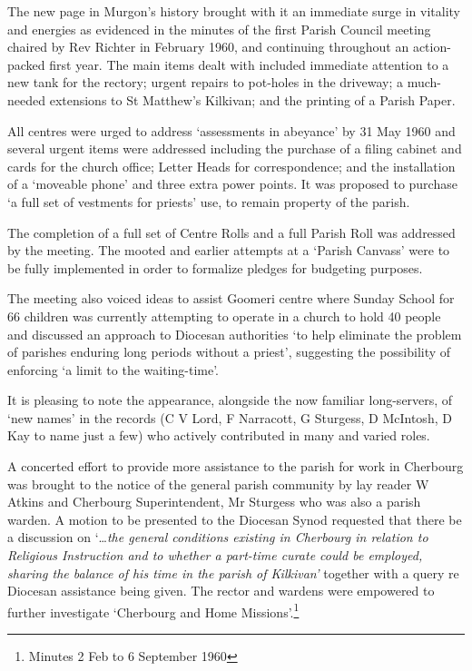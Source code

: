 The new page in Murgon's history brought with it an immediate surge in vitality and energies as evidenced in the minutes of the first Parish Council meeting chaired by Rev Richter in February 1960, and continuing throughout an action-packed first year. The main items dealt with included immediate attention to a new tank for the rectory; urgent repairs to pot-holes in the driveway; a much-needed extensions to St Matthew's Kilkivan; and the printing of a Parish Paper.

All centres were urged to address `assessments in abeyance' by 31 May 1960 and several urgent items were addressed including the purchase of a filing cabinet and cards for the church office; Letter Heads for correspondence; and the installation of a `moveable phone' and three extra power points. It was proposed to purchase `a full set of vestments for priests' use, to remain property of the parish.

The completion of a full set of Centre Rolls and a full Parish Roll was addressed by the meeting. The mooted and earlier attempts at a `Parish Canvass' were to be fully implemented in order to formalize pledges for budgeting purposes.

The meeting also voiced ideas to assist Goomeri centre where Sunday School for 66 children was currently attempting to operate in a church to hold 40 people and discussed an approach to Diocesan authorities `to help eliminate the problem of parishes enduring long periods without a priest', suggesting the possibility of enforcing `a limit to the waiting-time'.

It is pleasing to note the appearance, alongside the now familiar long-servers, of `new names' in the records (C V Lord, F Narracott, G Sturgess, D McIntosh, D Kay to name just a few) who actively contributed in many and varied roles.

A concerted effort to provide more assistance to the parish for work in Cherbourg was brought to the notice of the general parish community by lay reader W Atkins and Cherbourg Superintendent, Mr Sturgess who was also a parish warden. A motion to be presented to the Diocesan Synod requested that there be a discussion on `\ldots{}\emph{the general conditions existing in Cherbourg in relation to Religious Instruction and to whether a part-time curate could be employed, sharing the balance of his time in the parish of Kilkivan'} together with a query re Diocesan assistance being given. The rector and wardens were empowered to further investigate `Cherbourg and Home Missions'.\footnote{Minutes 2 Feb to 6 September 1960}

